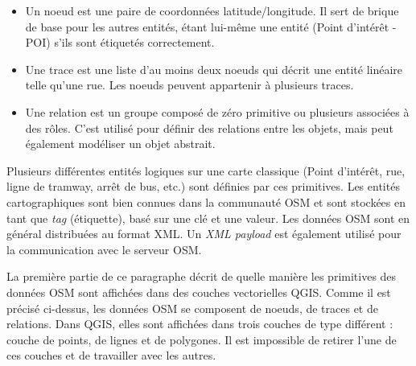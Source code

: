 \begin{itemize}[label=--]
\item Un noeud est une paire de coordonnées latitude/longitude. Il sert de brique de base pour les autres entités, étant lui-même une entité (Point d'intérêt - POI) s'ils sont étiquetés correctement.
\item Une trace est une liste d'au moins deux noeuds qui décrit une entité linéaire telle qu'une rue. Les noeuds peuvent appartenir à plusieurs traces.
\item Une relation est un groupe composé de zéro primitive ou plusieurs associées à des rôles. C'est utilisé pour définir des relations entre les objets, mais peut également modéliser un objet abstrait.
\end{itemize}

Plusieurs différentes entités logiques sur une carte classique (Point d'intérêt, rue, ligne de tramway, arrêt de bus, etc.) sont définies par ces primitives. Les entités cartographiques sont bien connues dans la communauté OSM et sont stockées en tant que \textit{tag} (étiquette), basé sur une clé et une valeur. Les données OSM sont en général distribuées au format XML. Un \textit{XML payload} est également utilisé pour la communication avec le serveur OSM.

\label{qgis-osm-connection}

La première partie de ce paragraphe décrit de quelle manière les primitives des données OSM sont affichées dans des couches vectorielles QGIS. Comme il est précisé ci-dessus, les données OSM se composent de noeuds, de traces et de relations. Dans QGIS, elles sont affichées dans trois couches de type différent : couche de points, de lignes et de polygones. Il est impossible de retirer l'une de ces couches et de travailler avec les autres.


